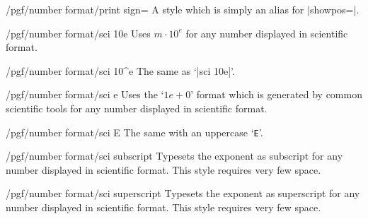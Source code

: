 \begin{stylekey}{/pgf/number format/print sign=}
	A style which is simply an alias for |showpos=|.
\end{stylekey}

\begin{key}{/pgf/number format/sci 10e}
Uses $m \cdot 10^e$ for any number displayed in scientific format.

\begin{codeexample}[]
\end{codeexample}
\end{key}

\begin{key}{/pgf/number format/sci 10\textasciicircum e}
The same as `|sci 10e|'.
\end{key}

\begin{key}{/pgf/number format/sci e}
Uses the `$1e{+}0$' format which is generated by common scientific tools for any number displayed in scientific format.

\begin{codeexample}[]
\end{codeexample}
\end{key}

\begin{key}{/pgf/number format/sci E}
The same with an uppercase `\texttt{E}'.

\begin{codeexample}[]
\end{codeexample}
\end{key}

\begin{key}{/pgf/number format/sci subscript}
Typesets the exponent as subscript for any number displayed in scientific format. This style requires very few space.

\begin{codeexample}[]
\end{codeexample}
\end{key}

\begin{key}{/pgf/number format/sci superscript}
Typesets the exponent as superscript for any number displayed in scientific format. This style requires very few space.

\begin{codeexample}[]
\end{codeexample}
\end{key}

